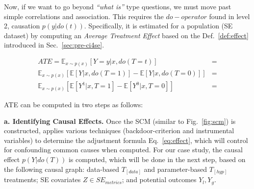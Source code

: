 Now, if we want to go beyond \textit{``what is''} type questions, we must move past simple correlations and association. This requires the $do-operator$ found in level 2, causation $p(y|do(t))$. Specifically, it is estimated for a population (\ie SE dataset) by computing an \textit{Average Treatment Effect} based on the Def.~\ref{def:effect} introduced in Sec.~\ref{sec:pre-ci4se}.


\begin{subequations}
    \begin{align}
     ATE = \mathbb{E}_{x\sim p(x)}[Y=y|x,do(T=t)]  &= \label{eq:ate-1}\\
     \mathbb{E}_{x\sim p(x)}[ \mathbb{E}[Y|x,do(T=1)] - \mathbb{E}[Y|x,do(T=0)] ] &= \label{eq:ate-2}\\
     \mathbb{E}_{x\sim p(x)}[ \mathbb{E}[Y^{1}|x,T=1] - \mathbb{E}[Y^{0}|x,T=0] ] &= \label{eq:ate-3}
    \end{align}
\label{eq:ate}
\end{subequations} 


ATE can be computed in two steps as follows:

\textbf{a. Identifying Causal Effects.} Once the SCM (similar to Fig.~\ref{fig:scm}) is constructed, \codegen applies various techniques (\ie backdoor-criterion and instrumental variables) to determine the adjustment formula Eq.~\ref{eq:effect}, which will control for confounding common causes when computed. For our case study, the causal effect $p(Y|do(T))$ is computed, which will be done in the next step, based on the following causal graph: data-based $T_{[data]}$ and parameter-based $T_{[hyp]}$ treatments; SE covariates $Z \in SE_{metrics}$; and potential outcomes $Y_l, Y_g$.

